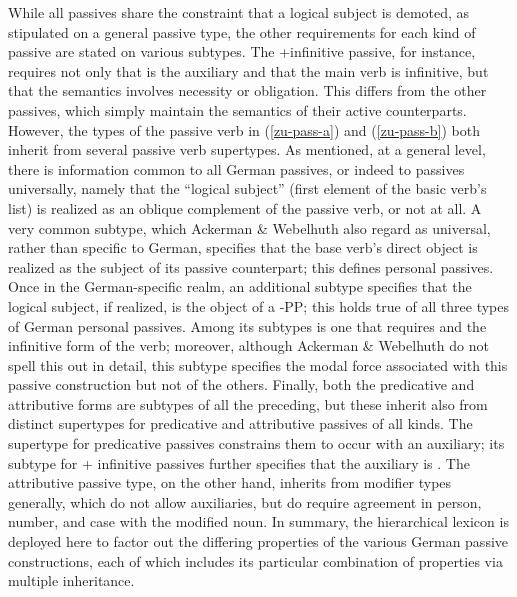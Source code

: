 \documentclass[output=paper
                ,modfonts
                ,nonflat
	        ,collection
	        ,collectionchapter
	        ,collectiontoclongg
 	        ,biblatex
                ,babelshorthands
                ,newtxmath
                ,draftmode
                ,colorlinks, citecolor=brown
]{./langsci/langscibook}
\begin{document}
{While all passives share the constraint that a logical subject is demoted, as stipulated on a general  passive type, the other requirements for each kind of passive are stated on various subtypes.
The +infinitive passive, for instance, requires not only that  is the auxiliary and that the main verb is infinitive, but that the semantics involves necessity or obligation.
This differs from the other passives, which simply maintain the semantics of their active counterparts.
However, the types of the passive verb  in (\ref{zu-pass-a}) and (\ref{zu-pass-b}) both inherit from several passive verb supertypes.
As mentioned, at a general level, there is information common to all German passives, or indeed to passives universally, namely that the ``logical subject'' (first element of the basic verb's  list) is realized as an oblique complement of the passive verb, or not at all.
A very common subtype, which Ackerman \& Webelhuth also regard as universal, rather than specific to German, specifies that the base verb's direct object is realized as the subject of its passive counterpart; this defines personal passives.
Once in the German-specific realm, an additional subtype specifies that the logical subject, if realized, is the object of a -PP; this holds true of all three types of German personal passives.
Among its subtypes is one that requires  and the infinitive form of the verb; moreover, although Ackerman \& Webelhuth do not spell this out in detail, this subtype specifies the modal force associated with this passive construction but not of the others.
Finally, both the predicative and attributive forms are subtypes of all the preceding, but these inherit also from distinct supertypes for predicative and attributive passives of all kinds.
The supertype for predicative passives constrains them to occur with an auxiliary; its subtype for  + infinitive passives further specifies that the auxiliary is .
The attributive passive type, on the other hand, inherits from modifier types generally, which do not allow auxiliaries, but do require agreement in person, number, and case with the modified noun.
In summary, the hierarchical lexicon is deployed here to factor out the differing properties of the various German passive constructions, each of which includes its particular combination of properties via multiple inheritance.

}
\end{document}
